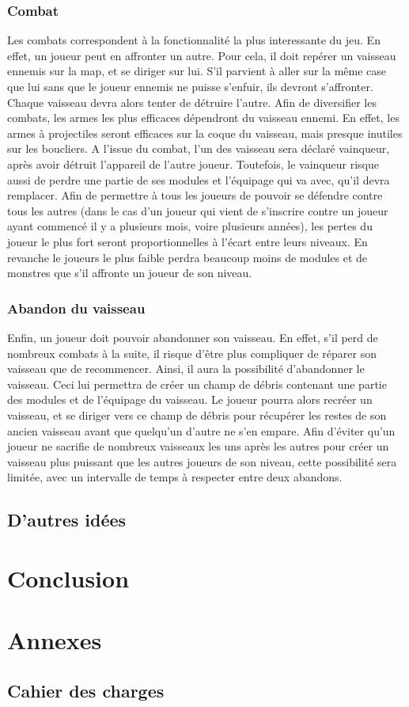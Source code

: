 \documentclass[a4paper,11pt]{report}
\begin{document}
    \subsection{Combat}
      Les combats correspondent à la fonctionnalité la plus interessante du jeu. En effet, un joueur peut en affronter un autre.
      Pour cela, il doit repérer un vaisseau ennemis sur la map, et se diriger sur lui. 
      S'il parvient à aller sur la même case que lui sans que le joueur ennemis ne puisse s'enfuir, ils devront s'affronter.
      Chaque vaisseau devra alors tenter de détruire l'autre. Afin de diversifier les combats, les armes les plus efficaces dépendront du vaisseau ennemi.
      En effet, les armes à projectiles seront efficaces sur la coque du vaisseau, mais presque inutiles sur les boucliers.
      A l'issue du combat, l'un des vaisseau sera déclaré vainqueur, après avoir détruit l'appareil de l'autre joueur. 
      Toutefois, le vainqueur risque aussi de perdre une partie de ses modules et l'équipage qui va avec, qu'il devra remplacer.
      Afin de permettre à tous les joueurs de pouvoir se défendre contre tous les autres (dans le cas d'un joueur qui vient de s'inscrire contre un joueur ayant commencé il y a plusieurs mois, voire plusieurs années), les pertes du joueur le plus fort seront proportionnelles à l'écart entre leurs niveaux.
      En revanche le joueurs le plus faible perdra beaucoup moins de modules et de monstres que s'il affronte un joueur de son niveau.
      
    
    \subsection{Abandon du vaisseau}
      Enfin, un joueur doit pouvoir abandonner son vaisseau. 
      En effet, s'il perd de nombreux combats à la suite, il risque d'être plus compliquer de réparer son vaisseau que de recommencer.
      Ainsi, il aura la possibilité d'abandonner le vaisseau. Ceci lui permettra de créer un champ de débris contenant une partie des modules et de l'équipage du vaisseau.
      Le joueur pourra alors recréer un vaisseau, et se diriger vers ce champ de débris pour récupérer les restes de son ancien vaisseau avant que quelqu'un d'autre ne s'en empare.
      Afin d'éviter qu'un joueur ne sacrifie de nombreux vaisseaux les uns après les autres pour créer un vaisseau plus puissant que les autres joueurs de son niveau, cette possibilité sera limitée, avec un intervalle de temps à respecter entre deux abandons.
      
  \section{D'autres idées}

\chapter{Conclusion}

\chapter{Annexes}

  \section{Cahier des charges}
    
\end{document}
